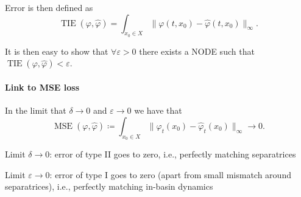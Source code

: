 \documentclass{article}
\theoremstyle{definition} \newtheorem{definition}{Definition}
\theoremstyle{remark} \newtheorem{remark}{Remark}
\newcounter{ct}
\begin{document}
Error is then defined as 
\begin{equation}
\operatorname{TIE}(\varphi, \hat{\varphi}) = \int_{x_0\in X}\|\varphi(t,x_0) - \hat{\varphi}(t, x_0)\|_\infty.
\end{equation}

It is then easy to show that $\forall\varepsilon>0$ there exists a NODE such that $\operatorname{TIE}(\varphi, \hat{\varphi})<\varepsilon$.

\paragraph{Link to MSE loss}
In the limit that $\delta\rightarrow 0$ and $\varepsilon\rightarrow 0$  we have that 
\[\operatorname{MSE}(\varphi, \hat{\varphi}) \coloneqq \int_{x_0\in X} \|\varphi_t(x_0) - \hat{\varphi}_t(x_0)\|_\infty \rightarrow 0.\]


Limit $\delta\rightarrow 0$: error of type II goes to zero, i.e., perfectly matching separatrices


Limit $\varepsilon\rightarrow 0$: error of type I goes to zero (apart from small mismatch around separatrices), i.e., perfectly matching in-basin dynamics
\end{document}
